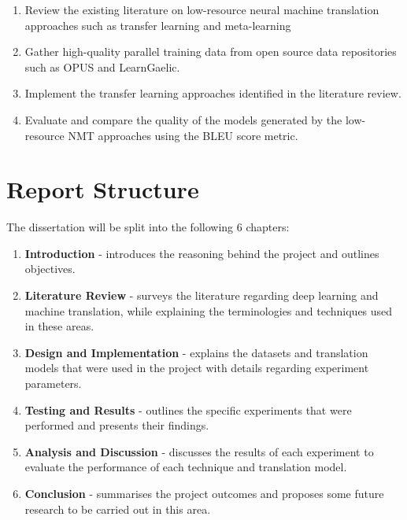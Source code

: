 \begin{enumerate}
  \item Review the existing literature on low-resource neural machine translation approaches such as transfer learning and meta-learning
  \item Gather high-quality parallel training data from open source data repositories such as OPUS and LearnGaelic.
  \item Implement the transfer learning approaches identified in the literature review.
  \item Evaluate and compare the quality of the models generated by the low-resource \acrshort{NMT} approaches using the \acrshort{BLEU} score metric.
\end{enumerate}


\section{Report Structure}
The dissertation will be split into the following 6 chapters:
\begin{enumerate}
    \item \textbf{Introduction} - introduces the reasoning behind the project and outlines objectives.
    \item \textbf{Literature Review} - surveys the literature regarding deep learning and machine translation, while explaining the terminologies and techniques used in these areas.
    \item \textbf{Design and Implementation} - explains the datasets and translation models that were used in the project with details regarding experiment parameters.
    \item \textbf{Testing and Results} - outlines the specific experiments that were performed and presents their findings.
    \item \textbf{Analysis and Discussion} - discusses the results of each experiment to evaluate the performance of each technique and translation model.
    \item \textbf{Conclusion} - summarises the project outcomes and proposes some future research to be carried out in this area.
\end{enumerate}